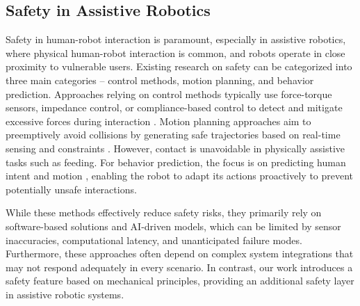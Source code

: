 



\subsection{Safety in Assistive Robotics}
Safety in human-robot interaction is paramount, especially in assistive robotics, where physical human-robot interaction is common, and robots operate in close proximity to vulnerable users. Existing research on safety can be categorized into three main categories -- control methods, motion planning, and behavior prediction. Approaches relying on control methods typically use force-torque sensors, impedance control, or compliance-based control to detect and mitigate excessive forces during interaction \cite{shaikewitz2023mouth, jenamani2024feel}. Motion planning approaches aim to preemptively avoid collisions by generating safe trajectories based on real-time sensing and constraints \cite{lasota2014toward}. However, contact is unavoidable in physically assistive tasks such as feeding. For behavior prediction, the focus is on predicting human intent and motion \cite{lasota2015analyzing, zhao2019walking}, enabling the robot to adapt its actions proactively to prevent potentially unsafe interactions.

While these methods effectively reduce safety risks, they primarily rely on software-based solutions and AI-driven models, which can be limited by sensor inaccuracies, computational latency, and unanticipated failure modes. Furthermore, these approaches often depend on complex system integrations \cite{hamad2023concise} that may not respond adequately in every scenario. In contrast, our work introduces a safety feature based on mechanical principles, providing an additional safety layer in assistive robotic systems.


